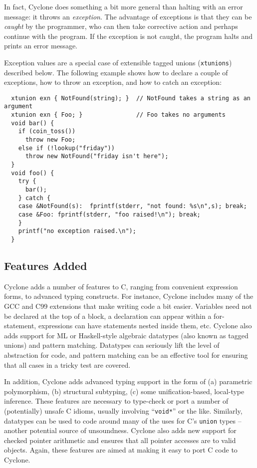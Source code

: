 In fact, Cyclone does something a bit more general than halting with
an error message: it throws an \emph{exception}.  The advantage of
exceptions is that they can be \emph{caught} by the programmer, who
can then take corrective action and perhaps continue with the program.
If the exception is not caught, the program halts and prints an error
message.

Exception values are a special case of extensible tagged unions
(\texttt{xtunions}) described below.  The following example shows how
to declare a couple of exceptions, how to throw an exception, and how
to catch an exception:
\begin{verbatim}
  xtunion exn { NotFound(string); }  // NotFound takes a string as an argument
  xtunion exn { Foo; }               // Foo takes no arguments
  void bar() {
    if (coin_toss()) 
      throw new Foo;
    else if (!lookup("friday"))
      throw new NotFound("friday isn't here");
  }
  void foo() {
    try {
      bar();
    } catch {
    case &NotFound(s):  fprintf(stderr, "not found: %s\n",s); break;
    case &Foo: fprintf(stderr, "foo raised!\n"); break;
    }
    printf("no exception raised.\n");
  }
\end{verbatim}

\subsection{Features Added}

Cyclone adds a number of features to C, ranging from convenient
expression forms, to advanced typing constructs.  For instance,
Cyclone includes many of the GCC and C99 extensions that make writing
code a bit easier.  Variables need not be declared at the top of a
block, a declaration can appear within a for-statement, expressions
can have statements nested inside them, etc.  Cyclone also adds
support for ML or Haskell-style algebraic datatypes (also known as
tagged unions) and pattern matching.  Datatypes can seriously lift the
level of abstraction for code, and pattern matching can be an
effective tool for ensuring that all cases in a tricky test are
covered.

In addition, Cyclone adds advanced typing support in the form of (a)
parametric polymorphism, (b) structural subtyping, (c) some
unification-based, local-type inference.  These features are necessary
to type-check or port a number of (potentially) unsafe C idioms,
usually involving ``\texttt{void*}'' or the like.  Similarly, datatypes
can be used to code around many of the uses for C's \texttt{union} types
-- another potential source of unsoundness.  Cyclone also adds new
support for checked pointer arithmetic and ensures that all pointer
accesses are to valid objects.  Again, these features are aimed at
making it easy to port C code to Cyclone.

